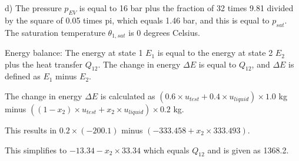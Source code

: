 d) The pressure \( p_{EV} \) is equal to 16 bar plus the fraction of 32 times 9.81 divided by the square of 0.05 times pi, which equals 1.46 bar, and this is equal to \( p_{sat} \). The saturation temperature \( \theta_{1,sat} \) is 0 degrees Celsius.

Energy balance:
The energy at state 1 \( E_1 \) is equal to the energy at state 2 \( E_2 \) plus the heat transfer \( Q_{12} \).
The change in energy \( \Delta E \) is equal to \( Q_{12} \), and \( \Delta E \) is defined as \( E_1 \) minus \( E_2 \).

The change in energy \( \Delta E \) is calculated as \( (0.6 \times u_{test} + 0.4 \times u_{liquid}) \times 1.0 \) kg minus \(((1 - x_2) \times u_{test} + x_2 \times u_{liquid}) \times 0.2 \) kg.

This results in \( 0.2 \times (-200.1) \) minus \((-333.458 + x_2 \times 333.493)\).

This simplifies to \(-13.34 - x_2 \times 33.34 \) which equals \( Q_{12} \) and is given as 1368.2.